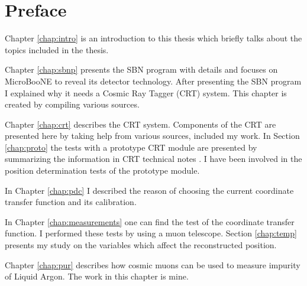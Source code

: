 \documentclass[a4paper]{article}\linespread{1.4}
\begin{document}
\thispagestyle{empty}
\newpage\null\thispagestyle{empty}
   
\section*{Preface} 

Chapter \ref{chap:intro} is an introduction to this thesis which briefly talks about the topics included in the thesis.


Chapter \ref{chap:sbnp} presents the SBN program with details and focuses on MicroBooNE to reveal its detector technology. After presenting the SBN program I explained why it needs a Cosmic Ray Tagger (CRT) system. This chapter is created by compiling various sources.

Chapter \ref{chap:crt} describes the CRT system. Components of the CRT are presented here by taking help from various sources, included my work.
In Section \ref{chap:proto} the tests with a prototype CRT module are presented by summarizing the information in CRT technical notes \cite{E}. I have been involved in the position determination tests of the prototype module.

In Chapter \ref{chap:pdc} I described the reason of choosing the current coordinate transfer function and its calibration.

In Chapter \ref{chap:measurements} one can find the test of the coordinate transfer function. I performed these tests by using a muon telescope.
Section \ref{chap:temp} presents my study on the variables which affect the reconstructed position.


Chapter \ref{chap:pur} describes how cosmic muons can be used to measure impurity of Liquid Argon. The work in this chapter is mine.
\end{document}
